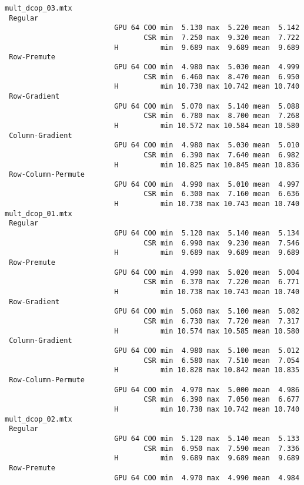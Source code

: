 {\begin{verbatim}
mult_dcop_03.mtx
 Regular
                          GPU 64 COO min  5.130 max  5.220 mean  5.142
                                 CSR min  7.250 max  9.320 mean  7.722
                          H          min  9.689 max  9.689 mean  9.689
 Row-Premute
                          GPU 64 COO min  4.980 max  5.030 mean  4.999
                                 CSR min  6.460 max  8.470 mean  6.950
                          H          min 10.738 max 10.742 mean 10.740
 Row-Gradient
                          GPU 64 COO min  5.070 max  5.140 mean  5.088
                                 CSR min  6.780 max  8.700 mean  7.268
                          H          min 10.572 max 10.584 mean 10.580
 Column-Gradient
                          GPU 64 COO min  4.980 max  5.030 mean  5.010
                                 CSR min  6.390 max  7.640 mean  6.982
                          H          min 10.825 max 10.845 mean 10.836
 Row-Column-Permute
                          GPU 64 COO min  4.990 max  5.010 mean  4.997
                                 CSR min  6.300 max  7.160 mean  6.636
                          H          min 10.738 max 10.743 mean 10.740
mult_dcop_01.mtx
 Regular
                          GPU 64 COO min  5.120 max  5.140 mean  5.134
                                 CSR min  6.990 max  9.230 mean  7.546
                          H          min  9.689 max  9.689 mean  9.689
 Row-Premute
                          GPU 64 COO min  4.990 max  5.020 mean  5.004
                                 CSR min  6.370 max  7.220 mean  6.771
                          H          min 10.738 max 10.743 mean 10.740
 Row-Gradient
                          GPU 64 COO min  5.060 max  5.100 mean  5.082
                                 CSR min  6.730 max  7.720 mean  7.317
                          H          min 10.574 max 10.585 mean 10.580
 Column-Gradient
                          GPU 64 COO min  4.980 max  5.100 mean  5.012
                                 CSR min  6.580 max  7.510 mean  7.054
                          H          min 10.828 max 10.842 mean 10.835
 Row-Column-Permute
                          GPU 64 COO min  4.970 max  5.000 mean  4.986
                                 CSR min  6.390 max  7.050 mean  6.677
                          H          min 10.738 max 10.742 mean 10.740
mult_dcop_02.mtx
 Regular
                          GPU 64 COO min  5.120 max  5.140 mean  5.133
                                 CSR min  6.950 max  7.590 mean  7.336
                          H          min  9.689 max  9.689 mean  9.689
 Row-Premute
                          GPU 64 COO min  4.970 max  4.990 mean  4.984

\end{verbatim}}
